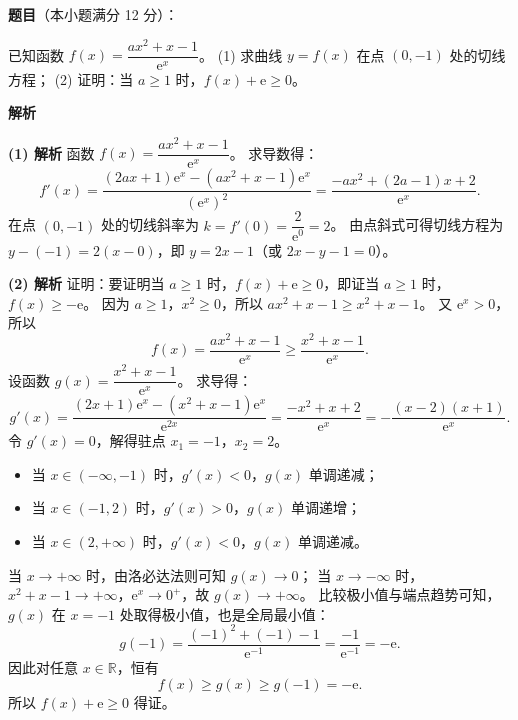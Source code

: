\begin{answer}

\textbf{题目}（本小题满分 12 分）：

已知函数 $f(x) = \dfrac{ax^2 + x - 1}{\mathrm e^x}$。
(1) 求曲线 $y = f(x)$ 在点 $(0, -1)$ 处的切线方程；
(2) 证明：当 $a \geqslant 1$ 时，$f(x) + \mathrm e \geqslant 0$。

\textbf{解析}

\textbf{(1) 解析} 函数 $f(x) = \dfrac{ax^2 + x - 1}{\mathrm e^x}$。
求导数得：
\nopagebreak[4]
\[f'(x) = \dfrac{(2ax + 1)\mathrm e^x - (ax^2 + x - 1)\mathrm e^x}{(\mathrm e^x)^2} = \dfrac{-ax^2 + (2a - 1)x + 2}{\mathrm e^x}.\]
在点 $(0, -1)$ 处的切线斜率为 $k = f'(0) = \dfrac{2}{\mathrm e^0} = 2$。
由点斜式可得切线方程为 $y - (-1) = 2(x - 0)$，即 $y = 2x - 1$（或 $2x - y - 1 = 0$）。

\textbf{(2) 解析} 证明：要证明当 $a \geqslant 1$ 时，$f(x) + \mathrm e \geqslant 0$，即证当 $a \geqslant 1$ 时，$f(x) \geqslant -\mathrm e$。
因为 $a \geqslant 1$，$x^2 \geqslant 0$，所以 $ax^2 + x - 1 \geqslant x^2 + x - 1$。
又 $\mathrm e^x > 0$，所以
\nopagebreak[4]
\[f(x) = \dfrac{ax^2 + x - 1}{\mathrm e^x} \geqslant \dfrac{x^2 + x - 1}{\mathrm e^x}.\]
设函数 $g(x) = \dfrac{x^2 + x - 1}{\mathrm e^x}$。
求导得：
\nopagebreak[4]
\[g'(x) = \dfrac{(2x + 1)\mathrm e^x - (x^2 + x - 1)\mathrm e^x}{\mathrm e^{2x}} = \dfrac{-x^2 + x + 2}{\mathrm e^x} = -\dfrac{(x - 2)(x + 1)}{\mathrm e^x}.\]
令 $g'(x) = 0$，解得驻点 $x_1 = -1$，$x_2 = 2$。
\begin{itemize}
\item 当 $x \in (-\infty, -1)$ 时，$g'(x) < 0$，$g(x)$ 单调递减；
\item 当 $x \in (-1, 2)$ 时，$g'(x) > 0$，$g(x)$ 单调递增；
\item 当 $x \in (2, +\infty)$ 时，$g'(x) < 0$，$g(x)$ 单调递减。
\end{itemize}
当 $x \to +\infty$ 时，由洛必达法则可知 $g(x) \to 0$；
当 $x \to -\infty$ 时，$x^2 + x - 1 \to +\infty$，$\mathrm e^x \to 0^+$，故 $g(x) \to +\infty$。
比较极小值与端点趋势可知，$g(x)$ 在 $x = -1$ 处取得极小值，也是全局最小值：
\nopagebreak[4]
\[g(-1) = \dfrac{(-1)^2 + (-1) - 1}{\mathrm e^{-1}} = \dfrac{-1}{\mathrm e^{-1}} = -\mathrm e.\]
因此对任意 $x \in \mathbb R$，恒有
\nopagebreak[4]
\[f(x) \geqslant g(x) \geqslant g(-1) = -\mathrm e.\]
所以 $f(x) + \mathrm e \geqslant 0$ 得证。



\par\medskip

\end{answer}
